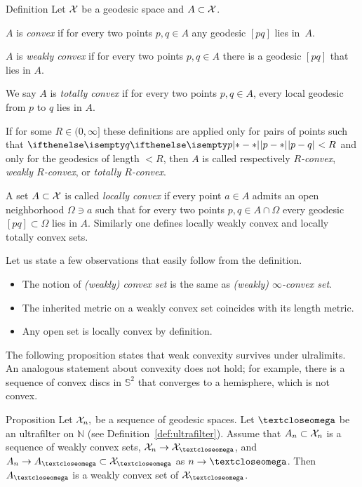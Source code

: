 \begin{thm}{Definition} 
\label{def:convex-set}
Let $\mathcal{X}$ be a geodesic space and $A\subset\spc{X}$.

$A$ is 
\emph{convex}
if for every two points $p,q\in A$ any geodesic $[pq]$ lies in~$A$.

$A$ is 
\emph{weakly convex}
if for every two points $p,q\in A$
there is a geodesic $[pq]$ 
that lies in $A$.

We say  $A$ is 
\emph{totally convex}
if for every two points $p,q\in A$, every local geodesic from $p$ to $q$ lies in $A$.

If for some $R\in (0,\infty]$ these definitions are applied only for pairs of points such that $\dist{p}{q}{}<R$ and only for the geodesics of length $<R$,
then $A$ is called respectively 
\emph{$R$-convex},
\emph{weakly $R$-convex},
or \emph{totally $R$-convex}.

A set $A\subset\spc{X}$ is called 
\emph{locally convex}
if every point $a\in A$ admits an open neighborhood $\Omega\ni a$
such that for every two points $p,q\in A\cap\Omega$ every geodesic $[pq]\subset \Omega$ lies in $A$.
Similarly one defines locally weakly convex and locally totally convex sets. %
\end{thm}

 Let us state a few observations that easily follow  from the definition.
\begin{itemize}
\item The notion of \emph{(weakly) convex set} is the same as {}\emph{(weakly) $\infty$-convex set}.
\item The inherited metric on a weakly convex set coincides with its length metric.
\item Any open set is locally convex by definition.
\end{itemize}

The following proposition states that weak convexity survives under ulralimits.
An analogous statement about convexity does not hold;
for example, there is a sequence of convex discs in $\mathbb{S}^2$ that converges to a hemisphere, which is not convex.

\begin{thm}{Proposition}\label{prop:weak-convex-stable}
Let $\mathcal{X}_n,$ be a sequence of geodesic spaces.
Let $\o$ be an ultrafilter on $\mathbb N$ (see Definition~\ref{def:ultrafilter}).
Assume that  $A_n\subset \spc{X}_n$ is a sequence of weakly convex sets, 
$\spc{X}_n\to \spc{X}_\o$,
and $A_n\to A_\o\subset \spc{X}_\o$ as $n\to\o$.
Then $A_\o$ is a weakly convex set of $\spc{X}_\o$.
\end{thm}

